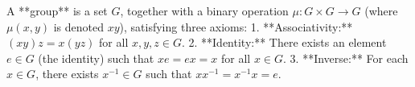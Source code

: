 A **group** is a set $G$, together with a binary operation $\mu: G \times G \to G$ (where $\mu(x,y)$ is denoted $xy$), satisfying three axioms:
1. **Associativity:** $(xy)z = x(yz)$ for all $x,y,z \in G$.
2. **Identity:** There exists an element $e \in G$ (the identity) such that $xe = ex = x$ for all $x \in G$.
3. **Inverse:** For each $x \in G$, there exists $x^{-1} \in G$ such that $xx^{-1} = x^{-1}x = e$.
